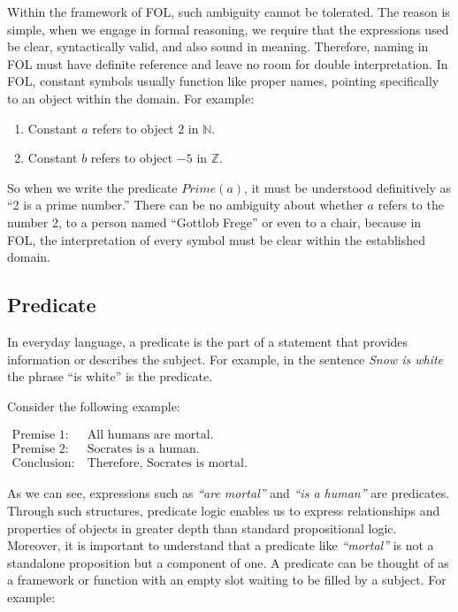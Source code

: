 \documentclass[12pt,a4paper,openany]{article}
\begin{document}
Within the framework of FOL, such ambiguity cannot be tolerated. The
reason is simple, when we engage in formal reasoning, we require that
the expressions used be clear, syntactically valid, and also sound in
meaning. Therefore, naming in FOL must have definite reference and leave
no room for double interpretation. In FOL, constant symbols usually
function like proper names, pointing specifically to an object within
the domain. For example:

\begin{enumerate}
\def\labelenumi{\arabic{enumi}.}
\item
  Constant \(a\) refers to object \(2\) in \(\mathbb{N}\).
\item
  Constant \(b\) refers to object \(-5\) in \(\mathbb{Z}\).
\end{enumerate}

So when we write the predicate \(Prime(a)\), it must be understood
definitively as ``2 is a prime number.'' There can be no ambiguity about
whether \(a\) refers to the number 2, to a person named ``Gottlob
Frege'' or even to a chair, because in FOL, the interpretation of every
symbol must be clear within the established domain.

\subsection{Predicate}\label{predicate}

In everyday language, a predicate is the part of a statement that
provides information or describes the subject. For example, in the
sentence \emph{Snow is white} the phrase ``is white'' is the predicate.

Consider the following example:

$
\begin{aligned}
\text{Premise 1:} \ & \text{All humans are mortal.} \\
\text{Premise 2:} \ & \text{Socrates is a human.} \\
\text{Conclusion:} \ & \text{Therefore, Socrates is mortal.}
\end{aligned}
$

As we can see, expressions such as \emph{``are mortal''} and \emph{``is
a human''} are predicates. Through such structures, predicate logic
enables us to express relationships and properties of objects in greater
depth than standard propositional logic. Moreover, it is important to
understand that a predicate like \emph{``mortal''} is not a standalone
proposition but a component of one. A predicate can be thought of as a
framework or function with an empty slot waiting to be filled by a
subject. For example:
\end{document}
